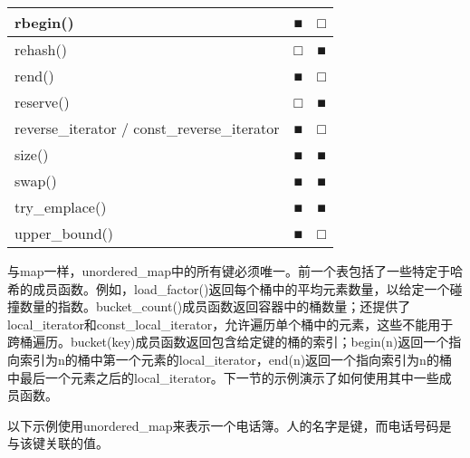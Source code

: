 \begin{longtable}{|l|l|l|}
rbegin()                                     & ■            & □                       \\ \hline
rehash()                                     & □            & ■                       \\ \hline
rend()                                       & ■            & □                       \\ \hline
reserve()                                    & □            & ■                       \\ \hline
reverse\_iterator / const\_reverse\_iterator & ■            & □                       \\ \hline
size()                                       & ■            & ■                       \\ \hline
swap()                                       & ■            & ■                       \\ \hline
try\_emplace()                               & ■            & ■                       \\ \hline
upper\_bound()                               & ■            & □                       \\ \hline
\end{longtable}

与map一样，unordered\_map中的所有键必须唯一。前一个表包括了一些特定于哈希的成员函数。例如，load\_factor()返回每个桶中的平均元素数量，以给定一个碰撞数量的指数。bucket\_count()成员函数返回容器中的桶数量；还提供了local\_iterator和const\_local\_iterator，允许遍历单个桶中的元素，这些不能用于跨桶遍历。bucket(key)成员函数返回包含给定键的桶的索引；begin(n)返回一个指向索引为n的桶中第一个元素的local\_iterator，end(n)返回一个指向索引为n的桶中最后一个元素之后的local\_iterator。下一节的示例演示了如何使用其中一些成员函数。


以下示例使用unordered\_map来表示一个电话簿。人的名字是键，而电话号码是与该键关联的值。

